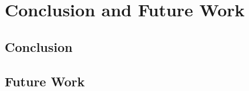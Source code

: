 \chapter{Conclusion and Future Work}
\label{ch:conclusion}

\section{Conclusion}

\section{Future Work}
